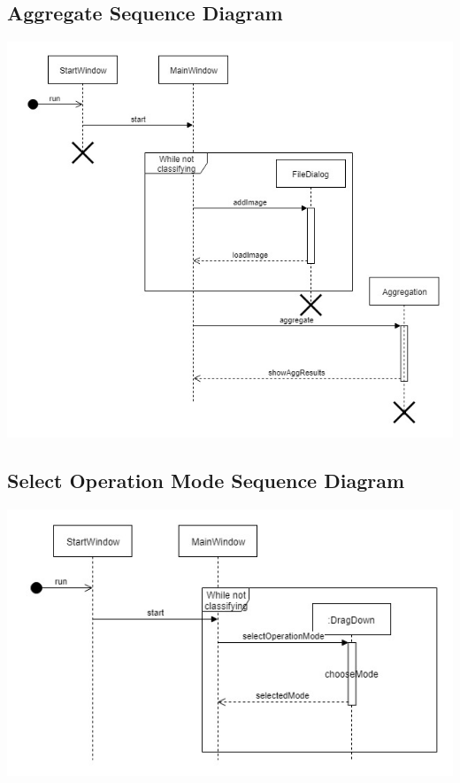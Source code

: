 \documentclass[parskip=full]{scrartcl}
\begin{document}
\pagebreak

\subsection {Aggregate Sequence Diagram}

\begin{center}
\includegraphics[width=1.0\textwidth]{Aggregate.jpg}
\end{center}

\pagebreak

\subsection {Select Operation Mode Sequence Diagram}

\begin{center}
\includegraphics[width=1.0\textwidth]{SelectOperationModeSequenceDiag.jpg}
\end{center}
\end{document}

